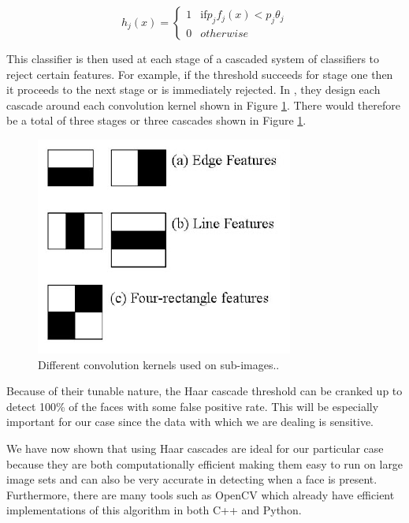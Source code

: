 \documentclass[
	submission,
	final,
	notitlepage,
	narroweqnarray,
	inline,
	twoside,
	]{ieee}
\begin{document}
\begin{equation}
   h_j(x) = \begin{cases}
     1  & \text{if} p_jf_j(x) < p_j \theta_j \\
     0 & otherwise
        \end{cases}
\end{equation}

This classifier is then used at each stage of a cascaded system of classifiers
to reject certain features. For example, if the threshold succeeds for stage one
then it proceeds to the next stage or is immediately rejected. In \cite{haar_cascades}, 
they design each cascade around each convolution kernel shown in Figure 
\ref{fig:haar_cascades}. There would therefore be a total of three stages
or three cascades shown in Figure \ref{fig:haar_cascades}.

\begin{figure}[h]
\centering
\includegraphics[width=\linewidth]{figures/haar_features}
\caption{Different convolution kernels used on sub-images..}
\label{fig:haar_cascades} 
\end{figure}

Because of their tunable nature, the Haar cascade threshold
can be cranked up to detect 100\% of the faces with some false 
positive rate. This will be especially important for our case
since the data with which we are dealing is sensitive. 

We have now shown that using Haar cascades are ideal for our 
particular case because they are both computationally efficient
making them easy to run on large image sets and can also be 
very accurate in detecting when a face is present. Furthermore, 
there are many tools such as OpenCV \cite{opencv} which already have
efficient implementations of this algorithm in both C++ and Python. 
\end{document}
